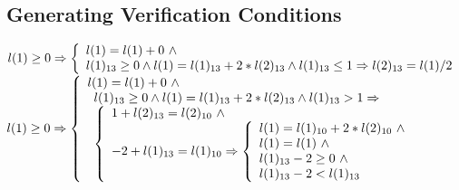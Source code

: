 \subsection{Generating Verification Conditions}

$
l(1) \ge 0 \Rightarrow
\left\{
\begin{array}{l}
l(1) = l(1) + 0 \  \wedge \\
l(1)_{13} \ge 0 \land
l(1)= l(1)_{13} + 2 * l(2)_{13} 
\land l(1)_{13} \le 1 \Rightarrow l(2)_{13} = l(1)/2
\end{array}
\right.\\
$
$
l(1) \ge 0 \Rightarrow
\left\{
\begin{array}{l}
l(1) = l(1) + 0 \ \wedge \\
\begin{array}{l}
l(1)_{13} \ge 0 \land
l(1) = l(1)_{13} + 2 * l(2)_{13} \land l(1)_{13} > 1 
\Rightarrow \\
\left\{ \begin{array}{l} 1 + l(2)_{13} = l(2)_{10} \ \wedge \\
-2 + l(1)_{13} = l(1)_{10} \Rightarrow \left\{ \begin{array}{l} l(1) = l(1)_{10} + 2 * l(2)_{10} \ \wedge \\ 
l(1) = l(1) \ \wedge \\ l(1)_{13} - 2 \ge 0 \ \wedge \\   l(1)_{13} - 2 <    l(1)_{13}  \end{array} \right.
\end{array} \right.\end{array} \end{array} \right. \\ 
 $
